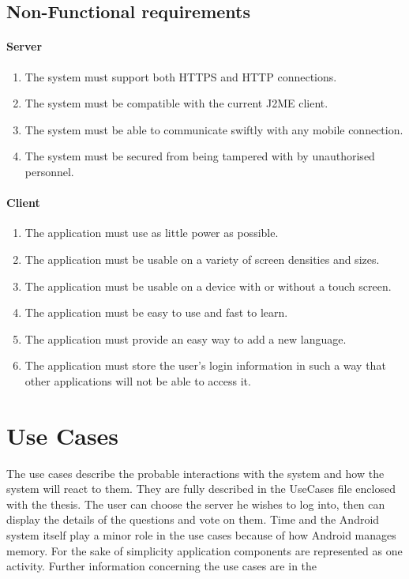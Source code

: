 \documentclass[11pt,twoside,a4paper]{book}
\begin{document}
\subsection{Non-Functional requirements}
\paragraph*{Server}
\begin{enumerate}
\item  The system must support both HTTPS and HTTP connections.
\item The system must be compatible with the current J2ME client.
\item The system must be able to communicate swiftly with any mobile connection.
\item The system must be secured from being tampered with by unauthorised personnel.
\end{enumerate}
\paragraph*{Client}
\begin{enumerate}
\item The application must use as little power as possible.
\item The application must be usable on a variety of screen densities and sizes.
\item The application must be usable on a device with or without a touch screen.
\item The application must be easy to use and fast to learn.
\item The application must provide an easy way to add a new language.
\item The application must store the user's login information in such a way that other applications will not be able to access it.
\end{enumerate}
\section{Use Cases}
The use cases describe the probable interactions with the system and how the system will react to them. They are fully described in the UseCases file enclosed with the thesis. The user can choose the server he wishes to log into, then can display the details of the questions and vote on them. Time and the Android system itself play a minor role in the use cases because of how Android manages memory. For the sake of simplicity application components are represented as one activity. Further information concerning the use cases are in the 
\end{document}
